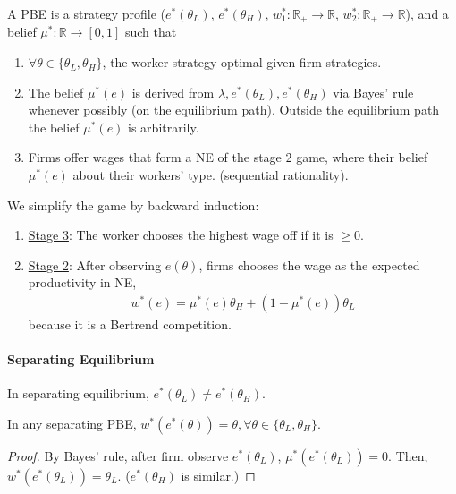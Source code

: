 \documentclass[11pt]{elegantbook_2}
\begin{document}
\begin{definition}
    A PBE is a strategy profile ($e^*(\theta_L)$, $e^*(\theta_H)$, $w^*_1: \mathbb{R}_+ \rightarrow \mathbb{R}$, $w^*_2: \mathbb{R}_+ \rightarrow \mathbb{R}$), and a belief $\mu^*: \mathbb{R} \rightarrow [0,1]$ such that
    \begin{enumerate}
        \item $\forall \theta\in\{\theta_L,\theta_H\}$, the worker strategy optimal given firm strategies.
        \item The belief $\mu^*(e)$ is derived from $\lambda, e^*(\theta_L), e^*(\theta_H)$ via Bayes' rule whenever possibly (on the equilibrium path). Outside the equilibrium path the belief $\mu^*(e)$ is arbitrarily.
        \item Firms offer wages that form a NE of the stage 2 game, where their belief $\mu^*(e)$ about their workers' type. (sequential rationality).
    \end{enumerate}
\end{definition}
We simplify the game by backward induction:
\begin{enumerate}
    \item \underline{Stage 3}: The worker chooses the highest wage off if it is $\geq 0$.
    \item \underline{Stage 2}: After observing $e(\theta)$, firms chooses the wage as the expected productivity in NE,
    \begin{equation}
        \begin{aligned}
            w^*(e)=\mu^*(e)\theta_H+(1-\mu^*(e))\theta_L
        \end{aligned}
        \nonumber
    \end{equation}
    because it is a Bertrend competition.
\end{enumerate}
\paragraph*{Separating Equilibrium}
In separating equilibrium, $e^*(\theta_L)\neq e^*(\theta_H)$.
\begin{lemma}
    In any separating PBE, $w^*(e^*(\theta))=\theta, \forall \theta\in\{\theta_L,\theta_H\}$.
\end{lemma}
\begin{proof}
    By Bayes' rule, after firm observe $e^*(\theta_L)$, $\mu^*(e^*(\theta_L))=0$. Then, $w^*(e^*(\theta_L))=\theta_L$. ($e^*(\theta_H)$ is similar.)
\end{proof}
\end{document}
